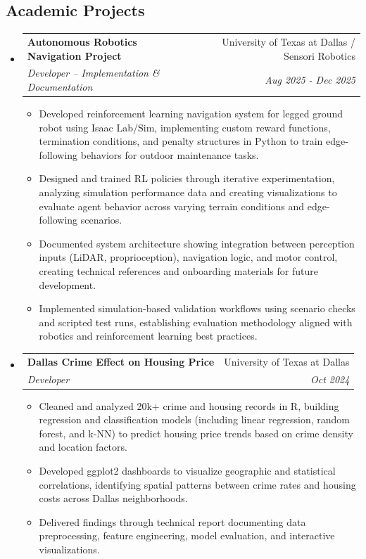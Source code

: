 \documentclass[letterpaper,11pt]{article}
\makeatletter
\newcommand{\resumeItem}[1]{
  \item\small{
    {#1 \vspace{-2pt}}
  }
}
\newcommand{\resumeSubheading}[4]{
  \vspace{-2pt}\item
    \begin{tabular*}{0.97\textwidth}[t]{l@{\extracolsep{\fill}}r}
      \textbf{#1} & #2 \\
      \textit{\small#3} & \textit{\small #4} \\
    \end{tabular*}\vspace{-7pt}
}
\newcommand{\resumeSubHeadingListStart}{\begin{itemize}[leftmargin=0.15in, label={}]}
\newcommand{\resumeSubHeadingListEnd}{\end{itemize}}
\newcommand{\resumeItemListStart}{\begin{itemize}}
\newcommand{\resumeItemListEnd}{\end{itemize}\vspace{-5pt}}
\makeatother
\begin{document}
\subsection*{Academic Projects}
  \resumeSubHeadingListStart
      
    \resumeSubheading
      {Autonomous Robotics Navigation Project}{University of Texas at Dallas / Sensori Robotics}
      {Developer – Implementation \& Documentation}{Aug 2025 - Dec 2025}
      \resumeItemListStart
        \resumeItem{Developed reinforcement learning navigation system for legged ground robot using Isaac Lab/Sim, implementing custom reward functions, termination conditions, and penalty structures in Python to train edge-following behaviors for outdoor maintenance tasks.}
        \resumeItem{Designed and trained RL policies through iterative experimentation, analyzing simulation performance data and creating visualizations to evaluate agent behavior across varying terrain conditions and edge-following scenarios.}
        \resumeItem{Documented system architecture showing integration between perception inputs (LiDAR, proprioception), navigation logic, and motor control, creating technical references and onboarding materials for future development.}
        \resumeItem{Implemented simulation-based validation workflows using scenario checks and scripted test runs, establishing evaluation methodology aligned with robotics and reinforcement learning best practices.}
      \resumeItemListEnd


    \resumeSubheading
      {Dallas Crime Effect on Housing Price}{University of Texas at Dallas}
      {Developer}{Oct 2024}
      \resumeItemListStart
        \resumeItem{Cleaned and analyzed 20k+ crime and housing records in R, building regression and classification models (including linear regression, random forest, and k-NN) to predict housing price trends based on crime density and location factors.}
        \resumeItem{Developed ggplot2 dashboards to visualize geographic and statistical correlations, identifying spatial patterns between crime rates and housing costs across Dallas neighborhoods.}
        \resumeItem{Delivered findings through technical report documenting data preprocessing, feature engineering, model evaluation, and interactive visualizations.}
      \resumeItemListEnd

  \resumeSubHeadingListEnd

\end{document}
